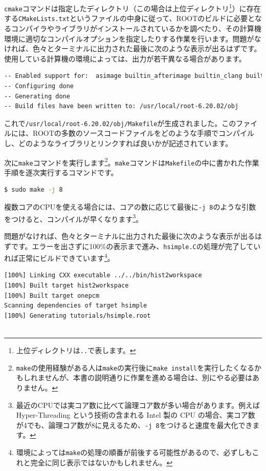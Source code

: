 {\texttt{cmake}コマンドは指定したディレクトリ（この場合は上位ディレクトリ\footnote{上位ディレクトリは\texttt{..}で表します。}）に存在する\texttt{CMakeLists.txt}というファイルの中身に従って、ROOTのビルドに必要となるコンパイラやライブラリがインストールされているかを調べたり、その計算機環境に適切なコンパイルオプションを指定したりする作業を行います。問題がなければ、色々とターミナルに出力された最後に次のような表示が出るはずです。使用している計算機の環境によっては、出力が若干異なる場合があります。
\begin{lstlisting}[language=bash]
-- Enabled support for:  asimage builtin_afterimage builtin_clang builtin_davix builtin_freetype builtin_ftgl builtin_gl2ps builtin_glew builtin_llvm builtin_lz4 builtin_openssl builtin_tbb builtin_vdt builtin_xxhash builtin_zstd clad cocoa dataframe davix exceptions gdml http imt libcxx mlp opengl pyroot roofit shared sqlite ssl tmva tmva-cpu tmva-pymva spectrum vdt xml
-- Configuring done
-- Generating done
-- Build files have been written to: /usr/local/root-6.20.02/obj
\end{lstlisting}

これで\texttt{/usr/local/root-6.20.02/obj/Makefile}が生成されました。このファイルには、ROOTの多数のソースコードファイルをどのような手順でコンパイルし、どのようなライブラリとリンクすれば良いかが記述されています。

次に\texttt{make}コマンドを実行します\footnote{\texttt{make}の使用経験がある人は\texttt{make}の実行後に\texttt{make install}を実行したくなるかもしれませんが、本書の説明通りに作業を進める場合は、別にやる必要はありません。}。\texttt{make}コマンドは\texttt{Makefile}の中に書かれた作業手順を逐次実行するコマンドです。
\begin{lstlisting}[language=bash]
$ sudo make -j 8
\end{lstlisting}
複数コアのCPUを使える場合には、コアの数に応じて最後に\texttt{-j 8}のような引数をつけると、コンパイルが早くなります\footnote{最近のCPUでは実コア数に比べて論理コア数が多い場合があります。例えば Hyper-Threading という技術の含まれる Intel 製の CPU の場合、実コア数が4でも、論理コア数が8に見えるため、\texttt{-j 8}をつけると速度を最大化できます。}。

問題がなければ、色々とターミナルに出力された最後に次のような表示が出るはずです。エラーを出さずに100\%の表示まで進み、\texttt{hsimple.C}の処理が完了していれば正常にビルドできています\footnote{環境によっては\texttt{make}の処理の順番が前後する可能性があるので、必ずしもこれと完全に同じ表示ではないかもしれません。}。
\begin{lstlisting}
[100%] Linking CXX executable ../../bin/hist2workspace
[100%] Built target hist2workspace
[100%] Built target onepcm
Scanning dependencies of target hsimple
[100%] Generating tutorials/hsimple.root


\end{lstlisting}}
